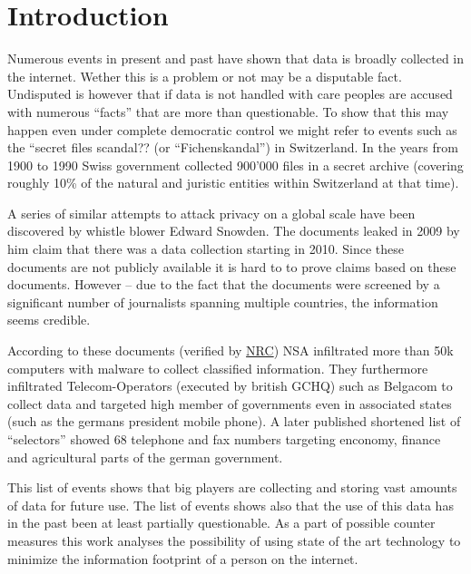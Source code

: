
\chapter{Introduction}
Numerous events in present and past have shown that data is broadly collected in the internet. Wether this is a problem or not may be a disputable fact. Undisputed is however that if data is not handled with care peoples are accused with numerous ``facts'' that are more than questionable. To show that this may happen even under complete democratic control we might refer to events such as the ``secret files scandal?? (or ``Fichenskandal'') in Switzerland. In the years  from 1900 to 1990 Swiss government collected 900'000 files in a secret archive (covering roughly 10\% of the natural and juristic entities within Switzerland at that time). 

A series of similar attempts to attack privacy on a global scale have been discovered by whistle blower Edward Snowden. The documents leaked in 2009 by him claim that there was a data collection starting in 2010. Since these documents are not publicly available it is hard to to prove claims based on these documents. However -- due to the fact that the documents were screened by a significant number of journalists spanning multiple countries, the information seems credible.

According to these documents (verified by \href{http://www.nrc.nl/nieuws/2013/11/23/nederland-sinds-1946-doelwit-van-nsa}{NRC}) NSA infiltrated more than 50k computers with malware to collect classified information. They furthermore infiltrated Telecom-Operators (executed by british GCHQ) such as Belgacom to collect data and targeted high member of governments even in associated states (such as the germans president mobile phone). A later published shortened list of ``selectors'' showed 68 telephone and fax numbers targeting enconomy, finance and agricultural parts of the german government.

This list of events shows that big players are collecting and storing vast amounts of data for future use. The list of events shows also that the use of this data has in the past been at least partially questionable. As a part of possible counter measures this work analyses the possibility of using state of the art technology to minimize the information footprint of a person on the internet. 

